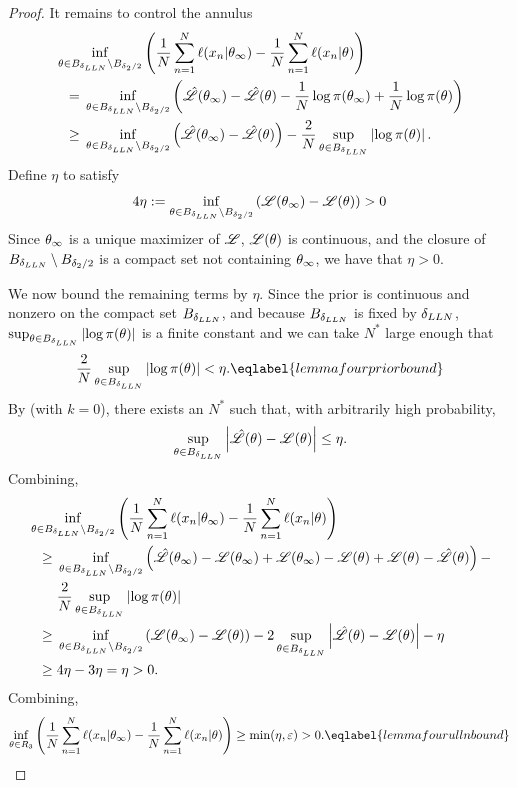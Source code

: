 \begin{lem}
\begin{proof}
It remains to control the annulus
\def\annulus{\thetaball{\deltaulln} \setminus \thetaball{\delta_2 / 2}}
$$
\begin{aligned}
\MoveEqLeft
\inf_{\theta \in \annulus}
    \left( \frac{1}{N} \sumn \ell(\x_n \vert \thetatrue) -
        \frac{1}{N} \sumn \ell(\x_n \vert \theta)
    \right)
\\={}&
\inf_{\theta \in \annulus}
    \left(
        \likhat(\thetatrue) - \likhat(\theta) -
        \frac{1}{N} \log \prior(\thetatrue) +
        \frac{1}{N} \log \prior(\theta)
    \right)
\\\ge{}&
\inf_{\theta \in \annulus}
    \left(
        \likhat(\thetatrue) - \likhat(\theta)
    \right) -
\frac{2}{N} \sup_{\theta \in \thetaball{\deltaulln}} \abs{
    \log \prior(\theta)
}.
\end{aligned}
$$
Define $\eta$ to satisfy
$$
4 \eta := \inf_{\theta \in \annulus} \left(\lik(\thetatrue) - \lik(\theta)\right) > 0
$$
Since $\theta_{\infty}$ is a unique maximizer of $\mathscr{L}$, $\mathscr{L}(\theta)$ is
continuous, and the closure of $\annulus$ is a compact set not containing
$\theta_{\infty}$, we have that $\eta > 0$.

We now bound the remaining terms by $\eta$.
Since the prior is continuous and nonzero on the
compact set $B_{\delta_{LLN}}$,
and because $B_{\delta_{LLN}}$ is fixed by
$\delta_{LLN}$, $\sup_{\theta \in B_{\delta_{LLN}}} \left\vert \log \pi(\theta)\right\vert$ is a
finite constant and we can take
$N^*$ large enough that
%
\begin{align}
\frac{2}{N} \sup_{\theta \in \thetaball{\deltaulln}} \abs{
    \log \prior(\theta)
} < \eta.
\eqlabel{lemmafourpriorbound}
\end{align}
%
By  (with $k = 0$), there exists an $N^*$ such that,
with arbitrarily high probability,
$$
\sup_{\theta \in B_{\delta_{LLN}}}
    \left\vert \hat{\mathscr{L}}(\theta) - \mathscr{L}(\theta)\right\vert \le    \eta.
$$
Combining,
$$
\begin{aligned}
\MoveEqLeft
\inf_{\theta \in \annulus}
    \left( \frac{1}{N} \sumn \ell(\x_n \vert \thetatrue) -
        \frac{1}{N} \sumn \ell(\x_n \vert \theta)
    \right)
\\\ge{}&
\inf_{\theta \in \annulus}
    \left(
        \likhat(\thetatrue) - \lik(\thetatrue) +
        \lik(\thetatrue) - \lik(\theta) +
        \lik(\theta) - \likhat(\theta)
    \right)
    -
\\{}&
    \frac{2}{N} \sup_{\theta \in \thetaball{\deltaulln}} \abs{
        \log \prior(\theta)
    }
\\\ge{}&
\inf_{\theta \in \annulus} \left(\lik(\thetatrue) - \lik(\theta) \right) -
2 \sup_{\theta \in \thetaball{\deltaulln}} \abs{\likhat(\theta) - \lik(\theta)}
- \eta
\\\ge{}&
4 \eta - 3 \eta = \eta > 0.
\end{aligned}
$$
Combining,
%
\begin{align}
\inf_{\theta \in R_3}
    \left( \frac{1}{N} \sumn \ell(\x_n \vert \thetatrue) -
        \frac{1}{N} \sumn \ell(\x_n \vert \theta)
    \right) \ge \textrm{min}(\eta, \varepsilon) > 0.
\eqlabel{lemmafourullnbound}
\end{align}


\end{proof}
\end{lem}

